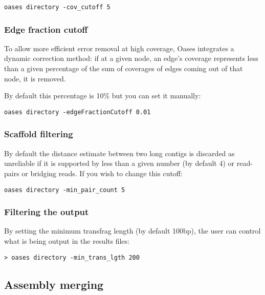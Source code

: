 \documentclass[12pt]{article}
\begin{document}
\begin{verbatim}
oases directory -cov_cutoff 5
\end{verbatim}

\subsubsection{Edge fraction cutoff}

To allow more efficient error removal at high coverage, Oases integrates a dynamic correction method: if at a given node, an edge's coverage represents less than a given percentage of the sum of coverages of edges coming out of that node, it is removed.

By default this percentage is 10\% but you can set it manually:

\begin{verbatim}
oases directory -edgeFractionCutoff 0.01
\end{verbatim}

\subsubsection{Scaffold filtering}

By default the distance estimate between two long contigs is discarded as unreliable if it is supported by less than a given number (by default 4) or read-pairs or bridging reads. If you wish to change this cutoff:

\begin{verbatim}
oases directory -min_pair_count 5
\end{verbatim}

\subsubsection{Filtering the output}\label{filtering}

By setting the minimum transfrag length (by default 100bp), the user can control what is being output in the results files:

\begin{verbatim}
> oases directory -min_trans_lgth 200
\end{verbatim}

\subsection{Assembly merging}
\end{document}
